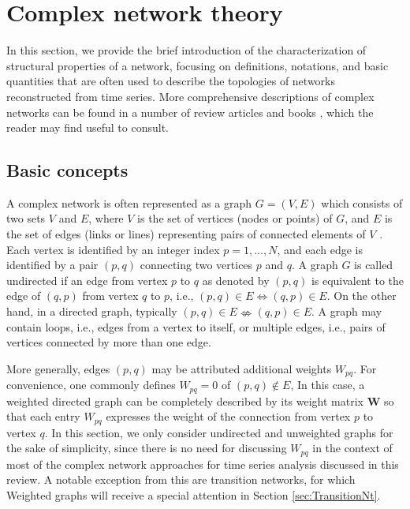 \section{Complex network theory} \label{sec:CompNetworkT}
In this section, we provide the brief introduction of the characterization of structural properties of a network, focusing on definitions, notations, and basic quantities that are often used to describe the topologies of networks reconstructed from time series. More comprehensive descriptions of complex networks can be found in a number of review articles \cite{Albert2002,Newman2003,Boccaletti2006,Costa2007} and books \cite{Cohenbook2010,Newmanbook2010}, which the reader may find useful to consult.  
	
	
	\subsection{Basic concepts} \label{sec:basicCompNets}
	A complex network is often represented as a graph $G = (V, E)$ which consists of two sets $V$ and $E$, where $V$ is the set of vertices (nodes or points) of $G$, and $E$ is the set of edges (links or lines) representing pairs of connected elements of $V$ \cite{Costa2007}. Each vertex is identified by an integer index $p=1,\dots,N$, and each edge is identified by a pair $(p,q)$ connecting two vertices $p$ and $q$. A graph $G$ is called undirected if an edge from vertex $p$ to $q$ as denoted by $(p,q)$ is equivalent to the edge of $(q,p)$ from vertex $q$ to $p$, i.e., $(p,q)\in E \Leftrightarrow (q,p)\in E$. On the other hand, in a directed graph, typically $(p,q)\in E \nLeftrightarrow (q,p)\in E$. A graph may contain loops, i.e., edges from a vertex to itself, or multiple edges, i.e., pairs of vertices connected by more than one edge. 
    
    More generally, edges $(p,q)$ may be attributed additional weights $W_{pq}$. For convenience, one commonly defines $W_{pq}=0$ of $(p,q)\notin E$, In this case, a weighted directed graph can be completely described by its weight matrix $\mathbf{W}$ so that each entry $W_{pq}$ expresses the weight of the connection from vertex $p$ to vertex $q$. In this section, we only consider undirected and unweighted graphs for the sake of simplicity, since there is no need for discussing $W_{pq}$ in the context of most of the complex network approaches for time series analysis discussed in this review. A notable exception from this are transition networks, for which Weighted graphs will receive a special attention in Section \ref{sec:TransitionNt}. 
	
